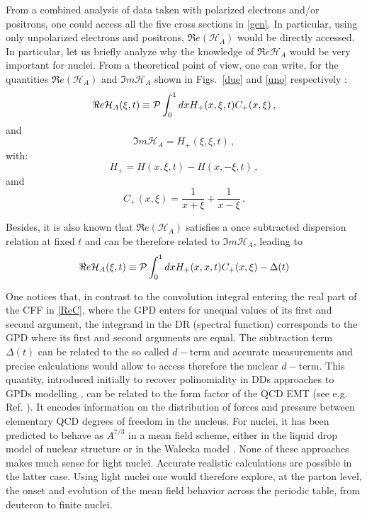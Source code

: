 \documentclass[times, twoside]{PosWhiPap}
\begin{document}
From a combined analysis of data taken with polarized electrons and/or 
positrons, one could access all the five cross sections in \eqref{gen}.
In particular, using only unpolarized electrons and positrons, $\Re 
e(\mathcal{H}_{A})$ would be directly accessed. In particular, let us briefly 
analyze why the knowledge of $\Re e\mathcal{H}_{A}$ would be very
important for nuclei. From a theoretical point of view, one can write,
for the quantities $\Re e(\mathcal{H}_{A})$ and $\Im m \mathcal{H}_{A}$
shown in Figs.~\ref{due} and \ref{uno} respectively \cite{Guidal:2013rya}:
\begin{equation}
\Re e \mathcal{H}_{A} (\xi,t) \equiv 
{\cal P} \int_0^1 dx H_+(x,\xi,t) C_+(x,\xi) \, ,
\label{ReC}
\end{equation}
and
\begin{equation}
  \Im m \mathcal{H}_{A} = H_+(\xi,\xi,t)  \, ,
\end{equation}
with:
\begin{equation}
    H_+ = H(x,\xi,t)-H(x,-\xi,t) \, ,
\end{equation}
amd
\begin{equation}
    C_+(x,\xi) = \frac{1}{x+\xi}+\frac{1}{x-\xi} \, .
\end{equation}


Besides, it is also known that $\Re e(\mathcal{H}_{A})$ satisfies a once 
subtracted dispersion relation at fixed $t$ and can be therefore related
to $\Im m \mathcal{H}_{A}$, leading to 
\cite{Anikin:2007yh,Diehl:2007jb,Radyushkin:2011dh,Pasquini:2014vua}
\begin{equation}
\Re e \mathcal{H}_{A} (\xi,t) \equiv
{\cal P} \int_0^1 dx H_+(x,x,t) C_+(x,\xi)
- \Delta(t)
\label{disp}
\end{equation}

One notices that, in contrast to the convolution integral entering the real 
part of the CFF in \eqref{ReC}, where the GPD enters for unequal values of its 
first and second argument, the integrand in the DR (spectral function) 
corresponds to the GPD where its first and second arguments are equal.
The subtraction term $\Delta(t)$ can be related to the so called $d-$term and
accurate measurements and precise calculations would allow to access therefore
the nuclear $d-$term. This quantity, introduced initially to recover 
polinomiality in DDs approaches to GPDs modelling \cite{Polyakov:1999gs},
can be related to the form factor of the QCD EMT (see e.g. Ref.  
\cite{Polyakov:2018zvc}). It encodes information on the distribution of forces 
and pressure between elementary QCD degrees of freedom in the nucleus. For
nuclei, it has been predicted to behave as $A^{7/3}$ in a mean field scheme, 
either in the liquid drop model of nuclear structure \cite{Polyakov:2002yz}
or in the Walecka model \cite{Jung:2014jja}. None of these approaches makes 
much sense for light nuclei. Accurate realistic calculations are possible in 
the latter case. Using light nuclei one would therefore explore, at the parton 
level, the onset and evolution of the mean field behavior across the periodic 
table, from deuteron to finite nuclei.
\end{document}
